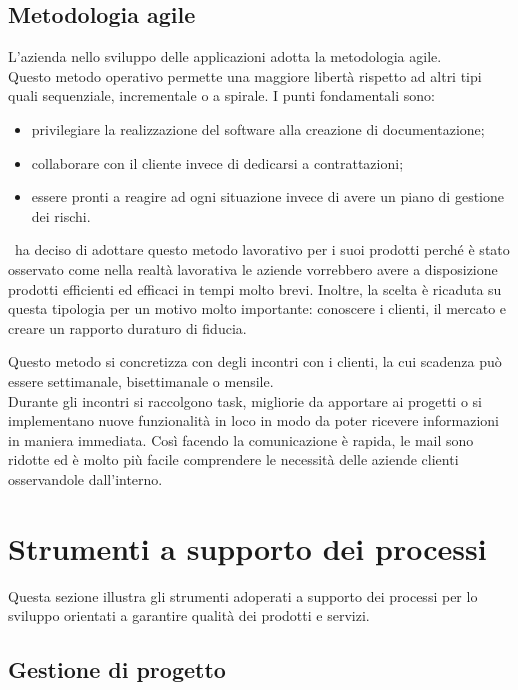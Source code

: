 \subsection{Metodologia agile}
\label{cap1:Metodologia agile}

L'azienda nello sviluppo delle applicazioni adotta la metodologia agile. \\
Questo metodo operativo permette una maggiore libertà rispetto ad altri tipi quali sequenziale, incrementale o a spirale. I punti fondamentali sono:
\begin{itemize}
	\item privilegiare la realizzazione del software alla creazione di documentazione;
	\item collaborare con il cliente invece di dedicarsi a contrattazioni;
	\item essere pronti a reagire ad ogni situazione invece di avere un piano di gestione dei rischi.
\end{itemize}
\azienda\ ha deciso di adottare questo metodo lavorativo per i suoi prodotti perché è stato  osservato come nella realtà lavorativa le aziende vorrebbero avere a disposizione prodotti efficienti ed efficaci in tempi molto brevi. 
Inoltre, la scelta è ricaduta su questa tipologia per un motivo molto importante: conoscere i clienti, il mercato e creare un rapporto duraturo di fiducia. 

Questo metodo si concretizza con degli incontri con i clienti, la cui scadenza può essere settimanale, bisettimanale o mensile.\\
Durante gli incontri si raccolgono task, migliorie da apportare ai progetti o si implementano nuove funzionalità in loco in modo da poter ricevere informazioni in maniera immediata. Così facendo la comunicazione è rapida, le mail sono ridotte ed è molto più facile comprendere le necessità delle aziende clienti osservandole dall'interno.


\section{Strumenti a supporto dei processi}
\label{cap1:Strumenti a supporto dei processi}
Questa sezione illustra gli strumenti adoperati a supporto dei processi per lo sviluppo orientati a garantire qualità dei prodotti e servizi.

\subsection{Gestione di progetto}
\label{cap1:Gestione di progetto}


